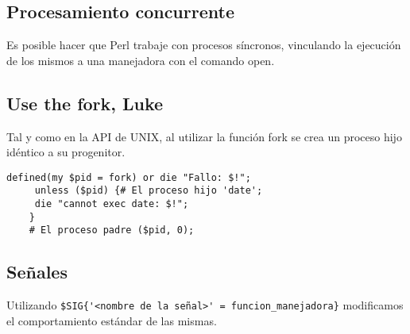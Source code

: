 \documentclass[12pt,a4paper]{memoir} %
\begin{document}
	\subsection{Procesamiento concurrente}
	Es posible hacer que Perl trabaje con procesos síncronos, vinculando la ejecución de los mismos a una manejadora con el comando open.
	\subsection{Use the fork, Luke}
	Tal y como en la API de UNIX, al utilizar la función fork se crea un proceso hijo idéntico a su progenitor.
	\begin{lstlisting}[frame=single, showspaces=false]
defined(my $pid = fork) or die "Fallo: $!"; 
     unless ($pid) {# El proceso hijo 'date';
     die "cannot exec date: $!";
	}
	# El proceso padre ($pid, 0);
	\end{lstlisting}
	
	\subsection{Señales}
	Utilizando \verb+$SIG{'<nombre de la señal>' = funcion_manejadora}+ modificamos el comportamiento estándar de las mismas.
	
\end{document}
